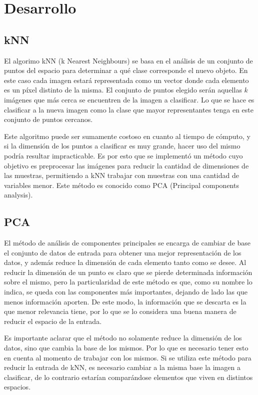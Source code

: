 \section{Desarrollo}

\subsection{kNN}

El algorimo kNN (k Nearest Neighbours) se basa en el análisis de un conjunto de puntos del espacio para determinar a qué clase corresponde el nuevo objeto. En este caso cada imagen estará representada como un vector donde cada elemento es un píxel distinto de la misma. El conjunto de puntos elegido serán aquellas $k$ imágenes que más cerca se encuentren de la imagen a clasificar. Lo que se hace es clasificar a la nueva imagen como la clase que mayor representantes tenga en este conjunto de puntos cercanos.

Este algoritmo puede ser sumamente costoso en cuanto al tiempo de cómputo, y si la dimensión de los puntos a clasificar es muy grande, hacer uso del mismo podría resultar impracticable. Es por esto que se implementó un método cuyo objetivo es preprocesar las imágenes para reducir la cantidad de dimensiones de las muestras, permitiendo a kNN trabajar con muestras con una cantidad de variables menor. Este método es conocido como PCA (Principal components analysis).

\subsection{PCA}

El método de análisis de componentes principales se encarga de cambiar de base el conjunto de datos de entrada para obtener una mejor representación de los datos, y además reduce la dimensión de cada elemento tanto como se desee. Al reducir la dimensión de un punto es claro que se pierde determinada información sobre el mismo, pero la particularidad de este método es que, como su nombre lo indica, se queda con las componentes más importantes, dejando de lado las que menos información aporten. De este modo, la información que se descarta es la que menor relevancia tiene, por lo que se lo considera una buena manera de reducir el espacio de la entrada.

Es importante aclarar que el método no solamente reduce la dimensión de los datos, sino que cambia la base de los mismos. Por lo que es necesario tener esto en cuenta al momento de trabajar con los mismos. Si se utiliza este método para reducir la entrada de kNN, es necesario cambiar a la misma base la imagen a clasificar, de lo contrario estarían comparándose elementos que viven en distintos espacios.

